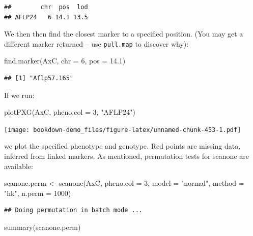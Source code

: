 \documentclass[
]{book}
\newenvironment{Shaded}{\begin{snugshade}}{\end{snugshade}}
\newcommand{\AttributeTok}[1]{\textcolor[rgb]{0.77,0.63,0.00}{#1}}
\newcommand{\DecValTok}[1]{\textcolor[rgb]{0.00,0.00,0.81}{#1}}
\newcommand{\FloatTok}[1]{\textcolor[rgb]{0.00,0.00,0.81}{#1}}
\newcommand{\FunctionTok}[1]{\textcolor[rgb]{0.00,0.00,0.00}{#1}}
\newcommand{\NormalTok}[1]{#1}
\newcommand{\OtherTok}[1]{\textcolor[rgb]{0.56,0.35,0.01}{#1}}
\newcommand{\StringTok}[1]{\textcolor[rgb]{0.31,0.60,0.02}{#1}}
\begin{document}
\begin{verbatim}
##        chr  pos  lod
## AFLP24   6 14.1 13.5
\end{verbatim}

We then then find the closest marker to a specified position. (You may get a different marker returned -- use \texttt{pull.map} to discover why):

\begin{Shaded}
\begin{Highlighting}[]
\FunctionTok{find.marker}\NormalTok{(AxC, }\AttributeTok{chr =} \DecValTok{6}\NormalTok{, }\AttributeTok{pos =} \FloatTok{14.1}\NormalTok{)}
\end{Highlighting}
\end{Shaded}

\begin{verbatim}
## [1] "Aflp57.165"
\end{verbatim}

If we run:

\begin{Shaded}
\begin{Highlighting}[]
\FunctionTok{plotPXG}\NormalTok{(AxC, }\AttributeTok{pheno.col =} \DecValTok{3}\NormalTok{, }\StringTok{"AFLP24"}\NormalTok{)}
\end{Highlighting}
\end{Shaded}

\texttt{[image: bookdown-demo\_files/figure-latex/unnamed-chunk-453-1.pdf]}

we plot the specified phenotype and genotype. Red points are missing data, inferred from linked markers. As mentioned, permutation tests for scanone are available:

\begin{Shaded}
\begin{Highlighting}[]
\NormalTok{scanone.perm }\OtherTok{\textless{}{-}} \FunctionTok{scanone}\NormalTok{(AxC, }\AttributeTok{pheno.col =} \DecValTok{3}\NormalTok{, }\AttributeTok{model =} \StringTok{"normal"}\NormalTok{, }
    \AttributeTok{method =} \StringTok{"hk"}\NormalTok{, }\AttributeTok{n.perm =} \DecValTok{1000}\NormalTok{)}
\end{Highlighting}
\end{Shaded}

\begin{verbatim}
## Doing permutation in batch mode ...
\end{verbatim}

\begin{Shaded}
\begin{Highlighting}[]
\FunctionTok{summary}\NormalTok{(scanone.perm)}
\end{Highlighting}
\end{Shaded}
\end{document}
